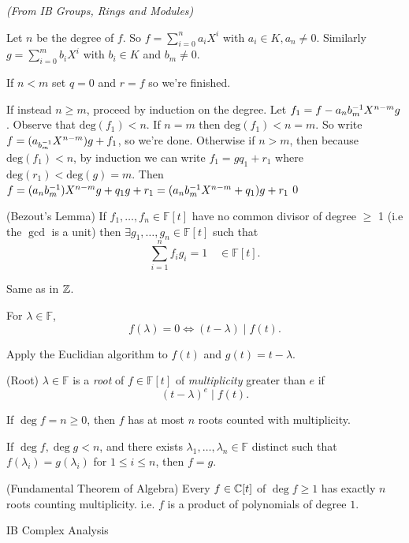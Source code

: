 \documentclass{article}
\newcommand{\F}{\mathbb{F}}
\begin{document}
\textit{(From IB Groups, Rings and Modules)}\par
\pf Let $ n $ be the degree of $ f $. So $ f=\sum_{i=0}^na_iX^i $ with $ a_i\in K,a_n\ne 0 $. Similarly $ g=\sum_{i=0}^mb_iX^i $ with $ b_i\in K $ and $ b_m\ne 0 $.\par                                                               If $ n< m $ set $ q=0 $ and $ r=f $ so we're finished.\par                   If instead $ n\ge m $, proceed by induction on the degree. Let $ f_1=f-a_n{b}^{-1}_mX^{n-m}g $. Observe that $ \mathrm{deg}(f_1)<n $. If $ n=m $ then $ \mathrm{deg}(f_1)<n=m $. So write $ f=(a_{{b}^{-1}_m}X^{n-m})g+f_1 $, so we're done. Otherwise if $ n>m $, then because $ \mathrm{deg}(f_1)<n $, by induction we can write $ f_1=gq_1+r_1 $ where $ \mathrm{deg}(r_1)<\mathrm{deg}(g)=m $. Then $ f=(a_n{b}^{-1}_m)X^{n-m}g+q_1g+r_1=(a_n{b}^{-1}_mX^{n-m}+q_1)g+r_1 $\qed
\begin{corollary}
	(Bezout's Lemma) If $ f_1,\dots, f_n\in \F[t] $ have no common divisor of degree $ \ge $ 1 (i.e the $ \gcd $ is a unit) then $ \exists g_1,\dots, g_n\in \F[t] $ such that
	\[
		\sum_{i=1}^nf_ig_i=1\quad\in \F[t].
	\]
\end{corollary}
\pf Same as in $ \mathbb{Z} $.
\begin{lemma}
  For $ \lambda\in \F $,
  \[
    f(\lambda)=0\iff (t-\lambda)\mid f(t).
  \]
\end{lemma}
\pf Apply the Euclidian algorithm to $ f(t) $ and $ g(t)=t-\lambda $.
\begin{definition}
	(Root) $ \lambda\in \F $ is a \textit{root} of $ f\in \F[t] $ of \textit{multiplicity} greater than $ e $ if
	\[
		(t-\lambda)^e\mid f(t).
	\]
\end{definition}
\begin{corollary}
  If $ \deg f = n\ge 0 $, then $ f $ has at most $ n $ roots counted with multiplicity.
\end{corollary}
\begin{corollary}
  If $ \deg f,\deg g < n $, and there exists $ \lambda_1,\dots, \lambda_n\in \F $ distinct such that $ f(\lambda_i)=g(\lambda_i) $ for $ 1\le i\le n $, then $ f=g $.
\end{corollary}
\begin{theorem}
	(Fundamental Theorem of Algebra) Every $ f\in \mathbb{C}[t] $ of $ \deg f\ge 1 $ has exactly $ n $ roots counting multiplicity. i.e. $ f $ is a product of polynomials of degree $ 1 $.
\end{theorem}
\pf IB Complex Analysis
\end{document}
